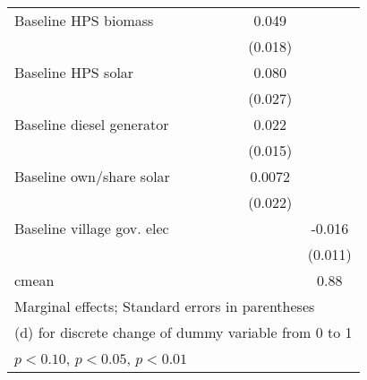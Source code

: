 \begin{table}[htbp]
\begin{tabular*}{1\hsize}{@{\hskip\tabcolsep\extracolsep\fill}l*{6}{c}}
Baseline HPS biomass&                  &                  &                  &                  &    0.049\sym{***}&                  \\
                &                  &                  &                  &                  &  (0.018)         &                  \\
Baseline HPS solar&                  &                  &                  &                  &    0.080\sym{***}&                  \\
                &                  &                  &                  &                  &  (0.027)         &                  \\
Baseline diesel generator&                  &                  &                  &                  &    0.022         &                  \\
                &                  &                  &                  &                  &  (0.015)         &                  \\
Baseline own/share solar&                  &                  &                  &                  &   0.0072         &                  \\
                &                  &                  &                  &                  &  (0.022)         &                  \\
Baseline village gov. elec&                  &                  &                  &                  &                  &   -0.016         \\
                &                  &                  &                  &                  &                  &  (0.011)         \\
\midrule
cmean           &                  &                  &                  &                  &                  &     0.88         \\
\bottomrule
\multicolumn{7}{l}{\footnotesize Marginal effects; Standard errors in parentheses}\\
\multicolumn{7}{l}{\footnotesize  (d) for discrete change of dummy variable from 0 to 1}\\
\multicolumn{7}{l}{\footnotesize \sym{*} \(p<0.10\), \sym{**} \(p<0.05\), \sym{***} \(p<0.01\)}\\
\end{tabular*}
\end{table}
